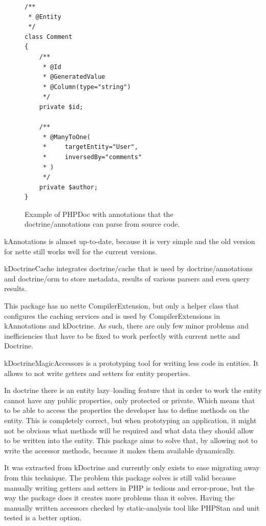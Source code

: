 \begin{figure} \label{fig:php:annotations-example}
\begin{lstlisting}
/**
 * @Entity
 */
class Comment
{
    /**
     * @Id
     * @GeneratedValue
     * @Column(type="string")
     */
    private $id;

    /**
     * @ManyToOne(
     *     targetEntity="User",
     *     inversedBy="comments"
     * )
     */
    private $author;
}
\end{lstlisting}
\caption{Example of PHPDoc with annotations that the doctrine/annotations can parse from source code.}
\end{figure}

\gls{kAnnotations} is almost up-to-date, because it is very simple and the old version for \gls{nette} still works well for the current versions.

 \label{sec:state:doctrine-cache}

\gls{kDoctrineCache} integrates doctrine/cache that is used by doctrine/annotations and doctrine/orm to store metadata, results of various parsers and even query results.

This package has no \gls{nette} CompilerExtension, but only a helper class that configures the caching services and is used by CompilerExtensions in \gls{kAnnotations} and \gls{kDoctrine}. As such, there are only few minor problems and inefficiencies that have to be fixed to work perfectly with current \gls{nette} and Doctrine.

 \label{sec:state:doctrine-magic-accessors}

\gls{kDoctrineMagicAccessors} is a prototyping tool for writing less code in entities. It allows to not write getters and setters for entity properties.

In \gls{doctrine} there is an entity lazy--loading feature that in order to work the entity cannot have any public properties, only protected or private. Which means that to be able to access the properties the developer has to define methods on the entity. This is completely correct, but when prototyping an application, it might not be obvious what methods will be required and what data they should allow to be written into the entity. This package aims to solve that, by allowing not to write the accessor methods, because it makes them available dynamically.

It was extracted from \gls{kDoctrine} and currently only exists to ease migrating away from this technique. The problem this package solves is still valid because manually writing getters and setters in PHP is tedious and error-prone, but the way the package does it creates more problems than it solves. Having the manually written accessors checked by static-analysis tool like PHPStan and unit tested is a better option.

